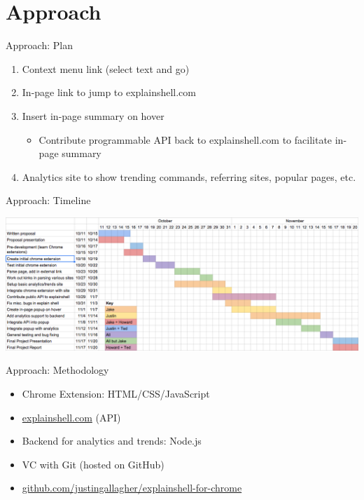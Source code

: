 \documentclass[xcolor=dvipsnames]{beamer}
\begin{document}
\section{Approach}\label{approach}
\begin{frame}{Approach: Plan}

\begin{enumerate}
\def\labelenumi{\arabic{enumi}.}
\itemsep1pt\parskip0pt
\item
  Context menu link (select text and go)
\item
  In-page link to jump to explainshell.com
\item
  Insert in-page summary on hover

  \begin{itemize}
  \itemsep1pt\parskip0pt
  \item
    Contribute programmable API back to explainshell.com to facilitate
    in-page summary
  \end{itemize}
\item
  Analytics site to show trending commands, referring sites, popular
  pages, etc.
\end{enumerate}

\end{frame}

\begin{frame}{Approach: Timeline}
  \begin{center}
    \includegraphics[width=\textwidth,height=\textheight,keepaspectratio]{../gantt-chart}
  \end{center}
\end{frame}

\begin{frame}{Approach: Methodology}

\begin{itemize}
\itemsep1pt\parskip0pt
\item
  Chrome Extension: HTML/CSS/JavaScript
\item
  \href{http://explainshell.com/}{explainshell.com} (API)
\item
  Backend for analytics and trends: Node.js
\item
  VC with Git (hosted on GitHub)
\item
  \href{http://github.com/justingallagher/explainshell-for-chrome}{github.com/justingallagher/explainshell-for-chrome}
\end{itemize}

\end{frame}
\end{document}
